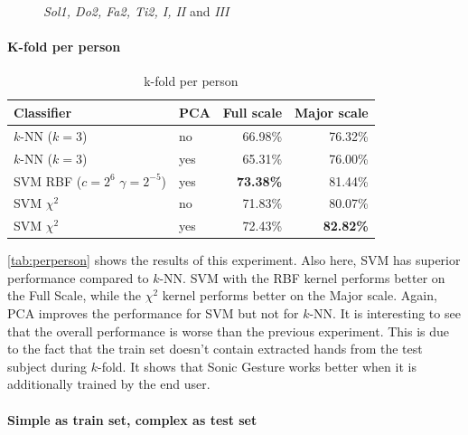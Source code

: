 \begin{figure}[tb]
\hspace{0.03\linewidth}
\caption{\emph{Sol1, Do2, Fa2, Ti2, I, II} and \emph{III}}
\label{fig:goodhands}
\end{figure}


\paragraph{K-fold per person}

\begin{table}
\centering
\begin{tabular}{llrr}
\hline\hline
 Classifier & PCA	& Full scale	& Major scale \\
\hline
$k$-NN ($k=3$) &	no	& 66.98\% & 76.32\%	\\
$k$-NN ($k=3$) &	yes	& 65.31\% & 76.00\%	\\
SVM RBF ($c=2^6$ $\gamma=2^{-5}$) & yes & \textbf{73.38\%} & 81.44\%	\\
SVM $\chi^2$ &	no	&  71.83\% & 80.07\% \\
SVM $\chi^2$ &	yes	&  72.43\% & \textbf{82.82\%} \\
\hline
\end{tabular}
\caption{k-fold per person}
\label{tab:perperson}
\end{table}


\autoref{tab:perperson} shows the results of this experiment. Also here, SVM has superior performance compared to $k$-NN. SVM with the RBF kernel performs better on the Full Scale, while the $\chi^2$ kernel performs better on the Major scale. Again, PCA improves the performance for SVM but not for $k$-NN. It is interesting to see that the overall performance is worse than the previous experiment. This is due to the fact that the train set doesn't contain extracted hands from the test subject during $k$-fold. It shows that Sonic Gesture works better when it is additionally trained by the end user.

\paragraph{Simple as train set, complex as test set}


